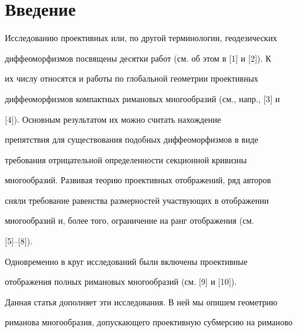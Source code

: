 \date{} 




\pagestyle{plain} %


 




\maketitle 


\label{begin} 


 


\section*{Введение} 


 


Исследованию проективных или, по другой терминологии, геодезических 


диффеоморфизмов посвящены десятки работ (см. об этом в [1] и [2]). К 


их числу относятся и работы по глобальной геометрии проективных 


диффеоморфизмов компактных римановых многообразий (см., напр., [3] и 


[4]). Основным результатом их можно считать нахождение


препятствия для существования подобных диффеоморфизмов в виде 


требования отрицательной определенности секционной кривизны 


многообразий. Развивая теорию проективных отображений, ряд авторов 


сняли требование равенства размерностей участвующих в отображении 


многообразий и, более того, ограничение на ранг отображения (см. 


[5]--[8]). 


Одновременно в круг исследований были включены проективные 


отображения полных римановых многообразий (см. [9] и [10]). 


 


Данная статья дополняет эти исследования. В ней мы опишем геометрию 


риманова многообразия, допускающего проективную субмерсию на риманово 


